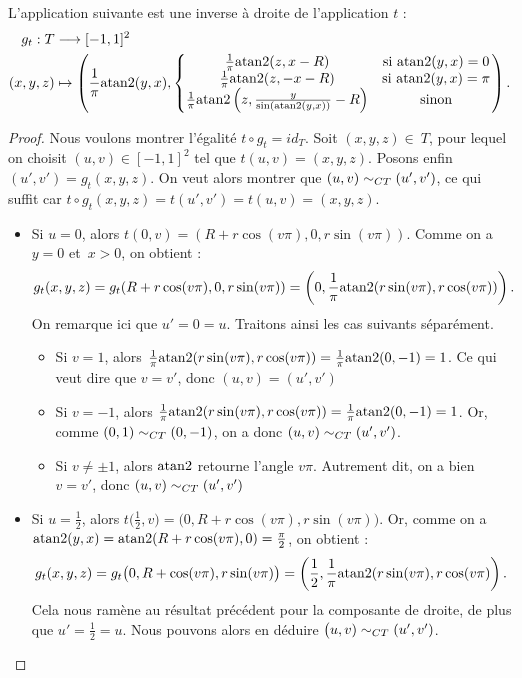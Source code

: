 \documentclass[hidelinks, 10pt]{article}
\begin{document}
\begin{proposition}\label{prop:torus-reciproque}
L'application suivante est une inverse à droite de l'application $t$ : \[\begin{split}
g_t:T&\longrightarrow [-1,1]^2\\
(x,y,z)&\mapsto\left (\frac{1}{\pi}\mathrm{atan}2(y,x),\left\{\begin{matrix}
\frac{1}{\pi}\mathrm{atan}2(z,x-R)&\text{si } \mathrm{atan}2(y,x)=0\\
\frac{1}{\pi}\mathrm{atan}2(z,-x-R)&\text{si } \mathrm{atan}2(y,x)=\pi\\
\frac{1}{\pi}\mathrm{atan}2\left(z,\frac{y}{\sin\left(\mathrm{atan}2(y,x)\right)}-R\right)&\text{sinon}
\end{matrix}\right. \right ).
\end{split}\]
\end{proposition}
\begin{proof}
Nous voulons montrer l'égalité $t\circ g_t=id_T$. Soit $(x,y,z)\in~T$, pour lequel on choisit $(u,v)\in[-1,1]^2$ tel que $t(u,v)=(x,y,z)$. Posons enfin~$(u',v')=g_t(x,y,z)$. On veut alors montrer que $(u,v)\sim_{CT}(u',v')$, ce qui suffit car $t\circ g_t(x,y,z)=t(u',v')=t(u,v)=(x,y,z)$. \begin{itemize}
    \item Si $u=0$, alors $t(0,v)=(R+r\cos(v\pi),0,r\sin(v\pi))$. Comme on a~$y=0$ et~$x>0$, on obtient :\begin{equation*}\label{eq:torus-proof-inv}
g_t(x,y,z)=g_t(R+r\cos(v\pi),0,r\sin(v\pi))=\left(0,\frac{1}{\pi}\mathrm{atan}2(r\sin(v\pi),r\cos(v\pi))\right).
    \end{equation*}On remarque ici que $u'=0=u$. Traitons ainsi les cas suivants séparément.\begin{itemize}
        \item Si $v=1$, alors $\frac{1}{\pi}\mathrm{atan}2(r\sin(v\pi),r\cos(v\pi))=\frac{1}{\pi}\mathrm{atan}2(0,-1)=1$. Ce qui veut dire que $v=v'$, donc $(u,v)=(u',v')$
        \item Si $v=-1$, alors $\frac{1}{\pi}\mathrm{atan}2(r\sin(v\pi),r\cos(v\pi))=\frac{1}{\pi}\mathrm{atan}2(0,-1)=1$. Or, comme $(0,1)\sim_{CT}(0,-1)$, on a donc $(u,v)\sim_{CT}(u',v')$.
        \item Si $v\neq\pm1$, alors $\mathrm{atan}2$ retourne l'angle $v\pi$. Autrement dit, on a bien~$v=v'$, donc $(u,v)\sim_{CT}(u',v')$
    \end{itemize}
    \item Si $u=\frac{1}{2}$, alors $t\big(\frac{1}{2},v\big)=\big(0,R+r\cos(v\pi),r\sin(v\pi)\big)$. Or, comme on a~$\mathrm{atan}2(y,x)=\mathrm{atan}2(R+r\cos(v\pi),0)=\frac{\pi}{2}$, on obtient : \[g_t(x,y,z)=g_t\big(0,R+\cos(v\pi),r\sin(v\pi)\big)=\left(\frac{1}{2},\frac{1}{\pi}\mathrm{atan}2(r\sin(v\pi),r\cos(v\pi)\right).\]Cela nous ramène au résultat précédent pour la composante de droite, de plus que $u'=\frac{1}{2}=u$. Nous pouvons alors en déduire $\big(u,v)\sim_{CT}(u',v')$.

\end{itemize}
\end{proof}
\end{document}
